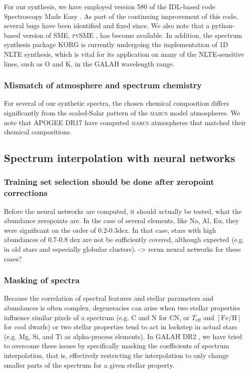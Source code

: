 \documentclass[
  journal=pasa,
  manuscript=research-paper, %
  year=2023,
  volume=37
]{cup-journal}
\newcommand{\Teff}{$T_\mathrm{eff}$\xspace}
\newcommand{\feh}{$\mathrm{[Fe/H]}$\xspace}
\newcommand{\marcs}{\textsc{marcs}\xspace}
\begin{document}
For our synthesis, we have employed version 580 of the IDL-based code Spectroscopy Made Easy \citep{Valenti1996, Piskunov2017}. As part of the continuing improvement of this code, several bugs have been identified and fixed since. We also note that a python-based version of SME, \textsc{pySME} \citep{Wehrhahn2021}, has become available. In addition, the spectrum synthesis package \textsc{KORG} \citep{Wheeler2023, Wheeler2024} is currently undergoing the implementation of 1D NLTE synthesis, which is vital for its application on many of the NLTE-sensitive lines, such as O and K, in the GALAH wavelength range.

\subsubsection{Mismatch of atmosphere and spectrum chemistry}

For several of our synthetic spectra, the chosen chemical composition differs significantly from the scaled-Solar pattern of the \marcs model atmospheres. We note that APOGEE DR17 \citep{SDSSDR17} have computed \marcs atmospheres that matched their chemical compositions.

\subsection{Spectrum interpolation with neural networks} \label{sec:caveats_interpolation}

\subsubsection{Training set selection should be done after zeropoint corrections}

Before the neural networks are computed, it should actually be tested, what the abundance zeropoints are. In the case of several elements, like Na, Al, Eu, they were significant on the order of 0.2-0.3dex. In that case, stars with high abundances of 0.7-0.8 dex are not be sufficiently covered, although expected (e.g. in old stars and especially globular clusters). -> rerun neural networks for these cases?

\subsubsection{Masking of spectra}

Because the correlation of spectral features and stellar parameters and abundances is often complex, degeneracies can arise when two stellar properties influence similar pixels of a spectrum (e.g. C and N for CN, or \Teff and \feh for cool dwarfs) or two stellar properties tend to act in lockstep in actual stars (e.g. Mg, Si, and Ti as alpha-process elements). In GALAH DR2 \citep{Buder2018}, we have tried to overcome these issues by specifically masking the coefficients of spectrum interpolation, that is, effectively restricting the interpolation to only change smaller parts of the spectrum for a given stellar property.
\end{document}
